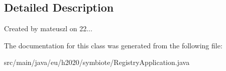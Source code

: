 \subsection{Detailed Description}
Created by mateuszl on 22... 

The documentation for this class was generated from the following file\+:\begin{DoxyCompactItemize}
\item 
src/main/java/eu/h2020/symbiote/Registry\+Application.\+java\end{DoxyCompactItemize}
